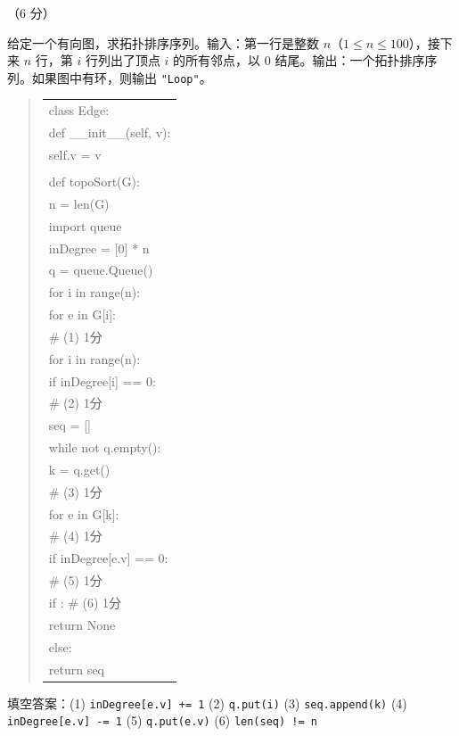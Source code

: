 \begin{question}[拓扑排序]（6 分）

给定一个有向图，求拓扑排序序列。输入：第一行是整数 $n$（$1\le n\le 100$），接下来 $n$ 行，第 $i$ 行列出了顶点 $i$ 的所有邻点，以 $0$ 结尾。输出：一个拓扑排序序列。如果图中有环，则输出 \texttt{"Loop"}。

\begin{quote}
\footnotesize
\begin{tabular}{@{}l@{}}
class Edge:\\
    def \_\_init\_\_(self, v):\\
        self.v = v\\
\\
def topoSort(G):\\
    n = len(G)\\
    import queue\\
    inDegree = [0] * n\\
    q = queue.Queue()\\
    for i in range(n):\\
        for e in G[i]:\\
\underline{\hspace{12em}} \# (1) 1分\\
    for i in range(n):\\
        if inDegree[i] == 0:\\
\underline{\hspace{12em}} \# (2) 1分\\
    seq = []\\
    while not q.empty():\\
        k = q.get()\\
\underline{\hspace{12em}} \# (3) 1分\\
        for e in G[k]:\\
\underline{\hspace{12em}} \# (4) 1分\\
            if inDegree[e.v] == 0:\\
\underline{\hspace{12em}} \# (5) 1分\\
    if \underline{\hspace{12em}}: \# (6) 1分\\
        return None\\
    else:\\
        return seq\\
\end{tabular}
\end{quote}

\begin{solution}
填空答案：(1) \texttt{inDegree[e.v] += 1} (2) \texttt{q.put(i)} (3) \texttt{seq.append(k)} (4) \texttt{inDegree[e.v] -= 1} (5) \texttt{q.put(e.v)} (6) \texttt{len(seq) != n}
\end{solution}
\end{question}

